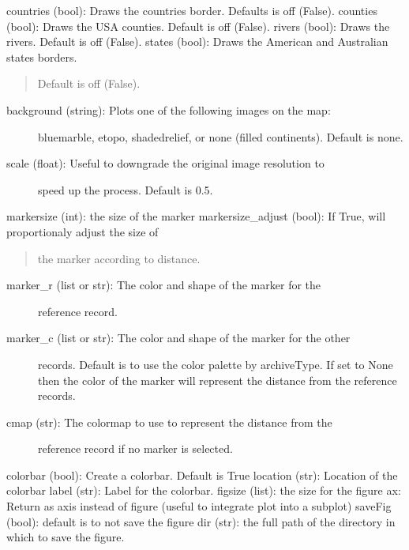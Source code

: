 \documentclass[letterpaper,10pt,english]{sphinxmanual}
\begin{document}
\begin{fulllineitems}
\begin{description}
countries (bool): Draws the countries border. Defaults is off (False).
counties (bool): Draws the USA counties. Default is off (False).
rivers (bool): Draws the rivers. Default is off (False).
states (bool): Draws the American and Australian states borders.
\begin{quote}

Default is off (False).
\end{quote}
\begin{description}
\item[{background (string): Plots one of the following images on the map:}] \leavevmode
bluemarble, etopo, shadedrelief, or none (filled continents).
Default is none.

\item[{scale (float): Useful to downgrade the original image resolution to}] \leavevmode
speed up the process. Default is 0.5.

\end{description}

markersize (int): the size of the marker
markersize\_adjust (bool): If True, will proportionaly adjust the size of
\begin{quote}

the marker according to distance.
\end{quote}
\begin{description}
\item[{marker\_r (list or str): The color and shape of the marker for the}] \leavevmode
reference record.

\item[{marker\_c (list or str): The color and shape of the marker for the other}] \leavevmode
records. Default is to use the color palette by archiveType. If set
to None then the color of the marker will represent the distance from
the reference records.

\item[{cmap (str): The colormap to use to represent the distance from the}] \leavevmode
reference record if no marker is selected.

\end{description}

colorbar (bool): Create a colorbar. Default is True
location (str): Location of the colorbar
label (str): Label for the colorbar.
figsize (list): the size for the figure
ax: Return as axis instead of figure (useful to integrate plot into a subplot)
saveFig (bool): default is to not save the figure
dir (str): the full path of the directory in which to save the figure.
\begin{quote}


\end{quote}
\end{description}
\end{fulllineitems}
\end{document}
